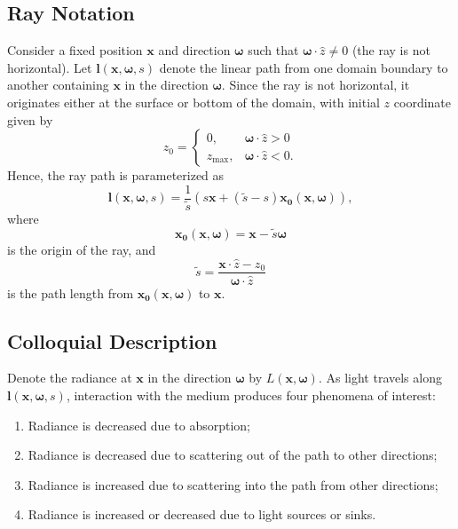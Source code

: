 \documentclass[ms,cpyr,lof,lot]{uathesis}
\newcommand\zmax{{z_{\max}}}
\renewcommand\vec\bm
\begin{document}
\subsection{Ray Notation}
Consider a fixed position $\vec{x}$ and direction $\vec{\omega}$ such that
$\vec{\omega} \cdot \hat{z} \neq 0$ (the ray is not horizontal).
Let $\vec{l}(\vec{x}, \vec{\omega}, s)$ denote the linear path from one domain boundary to another containing $\vec{x}$ in the direction $\vec{\omega}$.
Since the ray is not horizontal, it originates either at the surface or bottom of the domain, with initial $z$ coordinate given by
\begin{equation*}
  z_0 =
   \begin{cases}
    0, & \vec{\omega} \cdot \hat{z} > 0 \\
    \zmax, & \vec{\omega} \cdot \hat{z} < 0.
  \end{cases}
\end{equation*}
Hence, the ray path is parameterized as
\begin{equation}
  \vec{l}(\vec{x}, \vec{\omega}, s) = \frac{1}{\tilde{s}} (s\vec{x} + (\tilde{s} - s)\vec{x_0}(\vec{x}, \vec{\omega})),
  \label{eqn:ray_path}
\end{equation}
where
\begin{equation}
  \vec{x_0}(\vec{x}, \vec{\omega}) = \vec{x} - \tilde{s} \vec{\omega}
  \label{eqn:x_0}
\end{equation}
is the origin of the ray, and
\begin{equation*}
  \tilde{s} = \frac{\vec{x} \cdot \hat{z} - z_0}{\vec{\omega} \cdot \hat{z}}
\end{equation*}
is the path length from $\vec{x_0}(\vec{x}, \vec{\omega})$ to $\vec{x}$.

\subsection{Colloquial Description}
Denote the radiance at $\vec{x}$ in the direction $\vec{\omega}$ by $L(\vec{x}, \vec{\omega})$.
As light travels along $\vec{l}(\vec{x}, \vec{\omega}, s)$, interaction with the
medium produces four phenomena of interest:
\begin{enumerate}
  \item Radiance is decreased due to absorption;
  \item Radiance is decreased due to scattering out of the path to other
    directions;
  \item Radiance is increased due to scattering into the path from other
      directions;
  \item Radiance is increased or decreased due to light sources or sinks.
\end{enumerate}
\end{document}
